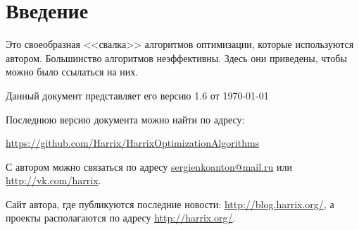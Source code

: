 \section{Введение}

Это своеобразная <<свалка>> алгоритмов оптимизации, которые используются автором. Большинство алгоритмов неэффективны. Здесь они приведены, чтобы можно было ссылаться на них.

Данный документ представляет его версию 1.6 от \today

Последнюю версию документа можно найти по адресу:

\href{https://github.com/Harrix/HarrixOptimizationAlgorithms}{https://github.com/Harrix/HarrixOptimizationAlgorithms}

С автором можно связаться по адресу \href{mailto:sergienkoanton@mail.ru}{sergienkoanton@mail.ru} или  \href{http://vk.com/harrix}{http://vk.com/harrix}.

Сайт автора, где публикуются последние новости: \href{http://blog.harrix.org/}{http://blog.harrix.org/}, а проекты располагаются по адресу \href{http://harrix.org/}{http://harrix.org/}.